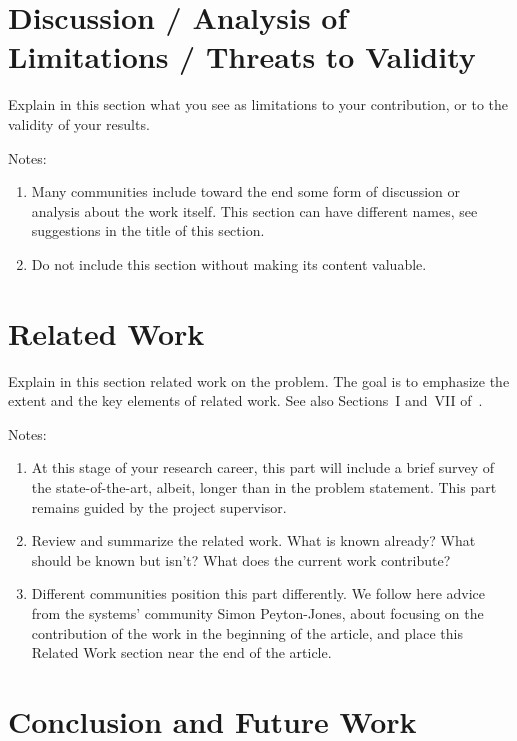\documentclass[11pt]{article}
\begin{document}
\section{Discussion / Analysis of Limitations / Threats to Validity} \label{sec:discussion}

Explain in this section what you see as limitations to your contribution, or to the validity of your results.

Notes:
\begin{enumerate}
    \item Many communities include toward the end some form of discussion or analysis about the work itself. This section can have different names, see suggestions in the title of this section.
    
    \item Do not include this section without making its content valuable.
\end{enumerate}



\section{Related Work} \label{sec:related}

Explain in this section related work on the problem. The goal is to emphasize the extent and the key elements of related work. 
See also Sections~I and~VII of~\cite{DBLP:conf/sc/AndreadisVMI18}.

Notes:
\begin{enumerate}
\item 
At this stage of your research career, this part will include a brief survey of the state-of-the-art, albeit, longer than in the problem statement. This part remains guided by the project supervisor. 

\item 
Review and summarize the related work. What is known already? What should be known but isn't? What does the current work contribute?

\item 
Different communities position this part differently. We follow here advice from the systems' community Simon Peyton-Jones, about focusing on the contribution of the work in the beginning of the article, and place this Related Work section near the end of the article.

\end{enumerate}



\section{Conclusion and Future Work} \label{sec:conclusion}
\end{document}
